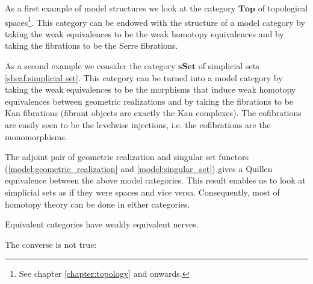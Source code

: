     \begin{example}
        As a first example of model structures we look at the category $\mathbf{Top}$ of topological spaces\footnote{See chapter \ref{chapter:topology} and onwards.}. This category can be endowed with the structure of a model category by taking the weak equivalences to be the weak homotopy equivalences and by taking the fibrations to be the Serre fibrations.
    \end{example}
    \begin{example}
        As a second example we consider the category $\mathbf{sSet}$ of simplicial sets \ref{sheaf:simplicial set}. This category can be turned into a model category by taking the weak equivalences to be the morphisms that induce weak homotopy equivalences between geometric realizations and by taking the fibrations to be Kan fibrations (fibrant objects are exactly the Kan complexes). The cofibrations are easily seen to be the levelwise injections, i.e. the cofibrations are the monomorphisms.
    \end{example}
    \begin{property}\label{cat:quillen_sset_top}
        The adjoint pair of geometric realization and singular set functors (\ref{model:geometric_realization} and \ref{model:singular_set}) gives a Quillen equivalence between the above model categories. This result enables us to look at simplicial sets as if they were spaces and vice versa. Consequently, most of homotopy theory can be done in either categories.
    \end{property}
    \begin{property}
        Equivalent categories have weakly equivalent nerves.
    \end{property}
    The converse is not true:

